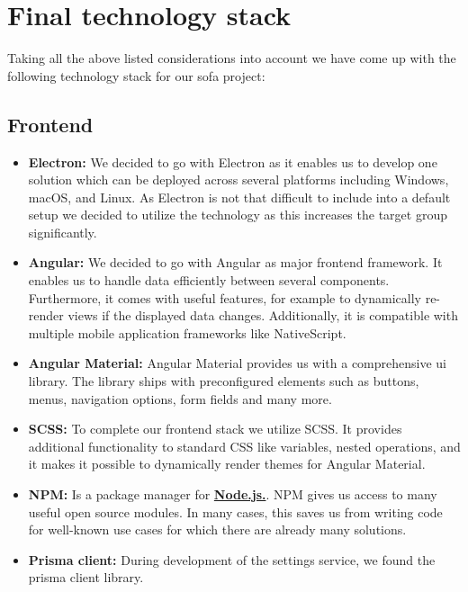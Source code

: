 \section{Final technology stack}\label{sec:final-technology-stack}

Taking all the above listed considerations into account we have come up with the following technology stack for our
\ac{sofa} project:

\subsection{Frontend}\label{subsec:frontend}

\begin{itemize}
    \item \textbf{Electron:} We decided to go with Electron as it enables us to develop one solution which can be
        deployed across several platforms including Windows, macOS, and Linux.
        As Electron is not that difficult to include into a default setup we decided to utilize the technology as this
        increases the target group significantly.
    \item \textbf{Angular:} We decided to go with Angular as major frontend framework.
        It enables us to handle data efficiently between several components.
        Furthermore, it comes with useful features, for example to dynamically re-render views if the displayed data
        changes.
        Additionally, it is compatible with multiple mobile application frameworks like NativeScript.
    \item \textbf{Angular Material:} Angular Material provides us with a comprehensive \ac{ui} library.
        The library ships with preconfigured elements such as buttons, menus, navigation options, form fields and many
        more.
    \item \textbf{SCSS:} To complete our frontend stack we utilize SCSS. It provides additional functionality to
        standard CSS like variables, nested operations, and it makes it possible to dynamically render themes for
        Angular Material.
    \item \textbf{NPM:} Is a package manager for \hyperref[subsec:backend]{\textbf{Node.js.}}.
        NPM gives us access to many useful open source modules.
        In many cases, this saves us from writing code for well-known use cases for which there are already many
        solutions.
    \item \textbf{Prisma client:} During development of the settings service, we found the prisma client library.

\end{itemize}
